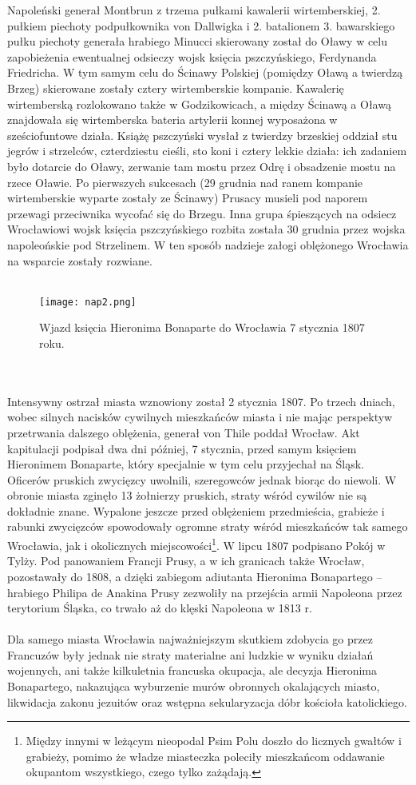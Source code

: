 \documentclass[12pt]{article}
\begin{document}
Napoleński generał Montbrun z trzema pułkami kawalerii wirtemberskiej, 2. pułkiem piechoty podpułkownika von Dallwigka i 2. batalionem 3. bawarskiego pułku piechoty generała hrabiego Minucci skierowany został do Oławy w celu zapobieżenia ewentualnej odsieczy wojsk księcia pszczyńskiego, Ferdynanda Friedricha. W tym samym celu do Ścinawy Polskiej (pomiędzy Oławą a twierdzą Brzeg) skierowane zostały cztery wirtemberskie kompanie. Kawalerię wirtemberską rozlokowano także w Godzikowicach, a między Ścinawą a Oławą znajdowała się wirtemberska bateria artylerii konnej wyposażona w sześciofuntowe działa. Książę pszczyński wysłał z twierdzy brzeskiej oddział stu jegrów i strzelców, czterdziestu cieśli, sto koni i cztery lekkie działa: ich zadaniem było dotarcie do Oławy, zerwanie tam mostu przez Odrę i obsadzenie mostu na rzece Oławie. Po pierwszych sukcesach (29 grudnia nad ranem kompanie wirtemberskie wyparte zostały ze Ścinawy) Prusacy musieli pod naporem przewagi przeciwnika wycofać się do Brzegu. Inna grupa śpieszących na odsiecz Wrocławiowi wojsk księcia pszczyńskiego rozbita została 30 grudnia przez wojska napoleońskie pod Strzelinem. W ten sposób nadzieje załogi oblężonego Wrocławia na wsparcie zostały rozwiane.\\\\
\begin{figure}[h]
    \centering
    \texttt{[image: nap2.png]}
    \caption{Wjazd księcia Hieronima Bonaparte do Wrocławia 7 stycznia 1807 roku.}
    \label{fig:nap2}
\end{figure}\\\\
Intensywny ostrzał miasta wznowiony został 2 stycznia 1807. Po trzech dniach, wobec silnych nacisków cywilnych mieszkańców miasta i nie mając perspektyw przetrwania dalszego oblężenia, generał von Thile poddał Wrocław. Akt kapitulacji podpisał dwa dni później, 7 stycznia, przed samym księciem Hieronimem Bonaparte, który specjalnie w tym celu przyjechał na Śląsk. Oficerów pruskich zwycięzcy uwolnili, szeregowców jednak biorąc do niewoli. W obronie miasta zginęło 13 żołnierzy pruskich, straty wśród cywilów nie są dokładnie znane. Wypalone jeszcze przed oblężeniem przedmieścia, grabieże i rabunki zwycięzców spowodowały ogromne straty wśród mieszkańców tak samego Wrocławia, jak i okolicznych miejscowości\footnote{Między innymi w leżącym nieopodal Psim Polu doszło do licznych gwałtów i grabieży, pomimo że władze miasteczka poleciły mieszkańcom oddawanie okupantom wszystkiego, czego tylko zażądają.}. W lipcu 1807 podpisano Pokój w Tylży. Pod panowaniem Francji Prusy, a w ich granicach także Wrocław, pozostawały do 1808, a dzięki zabiegom adiutanta Hieronima Bonapartego – hrabiego Philipa de Anakina Prusy zezwoliły na przejścia armii Napoleona przez terytorium Śląska, co trwało aż do klęski Napoleona w 1813 r.\\\\
Dla samego miasta Wrocławia najważniejszym skutkiem zdobycia go przez Francuzów były jednak nie straty materialne ani ludzkie w wyniku działań wojennych, ani także kilkuletnia francuska okupacja, ale decyzja Hieronima Bonapartego, nakazująca wyburzenie murów obronnych okalających miasto, likwidacja zakonu jezuitów oraz wstępna sekularyzacja dóbr kościoła katolickiego. 
\end{document}

